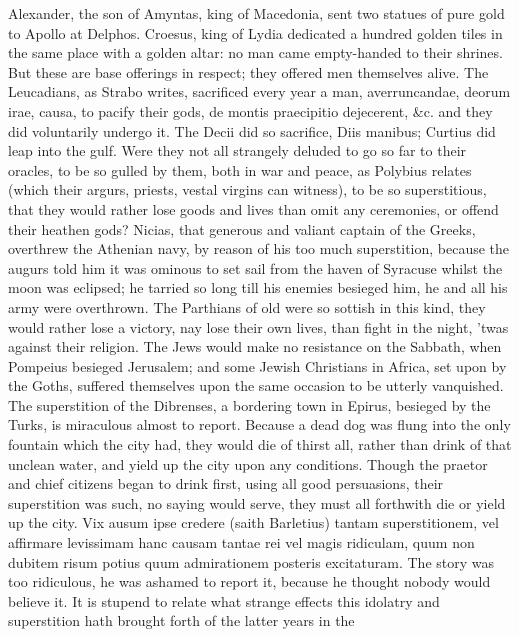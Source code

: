 {Alexander, the son of Amyntas, king of Macedonia, sent two
statues of pure gold to Apollo at Delphos. Croesus, king of Lydia
dedicated a hundred golden tiles in the same place with a golden altar:
no man came empty-handed to their shrines. But these are base offerings
in respect; they offered men themselves alive. The Leucadians, as
Strabo writes, sacrificed every year a man, averruncandae, deorum irae,
causa, to pacify their gods, de montis praecipitio dejecerent, \&c. and
they did voluntarily undergo it. The Decii did so sacrifice, Diis
manibus; Curtius did leap into the gulf. Were they not all strangely
deluded to go so far to their oracles, to be so gulled by them, both in
war and peace, as Polybius relates (which their argurs, priests, vestal
virgins can witness), to be so superstitious, that they would rather
lose goods and lives than omit any ceremonies, or offend their heathen
gods? Nicias, that generous and valiant captain of the Greeks,
overthrew the Athenian navy, by reason of his too much superstition,
 because the augurs told him it was ominous to set sail from the
haven of Syracuse whilst the moon was eclipsed; he tarried so long till
his enemies besieged him, he and all his army were overthrown. The
Parthians of old were so sottish in this kind, they would rather
lose a victory, nay lose their own lives, than fight in the night,
'twas against their religion. The Jews would make no resistance on the
Sabbath, when Pompeius besieged Jerusalem; and some Jewish Christians
in Africa, set upon by the Goths, suffered themselves upon the same
occasion to be utterly vanquished. The superstition of the Dibrenses, a
bordering town in Epirus, besieged by the Turks, is miraculous almost
to report. Because a dead dog was flung into the only fountain which
the city had, they would die of thirst all, rather than drink of that
unclean water, and yield up the city upon any conditions. Though
the praetor and chief citizens began to drink first, using all good
persuasions, their superstition was such, no saying would serve, they
must all forthwith die or yield up the city. Vix ausum ipse credere
(saith Barletius) tantam superstitionem, vel affirmare levissimam
hanc causam tantae rei vel magis ridiculam, quum non dubitem risum
potius quum admirationem posteris excitaturam. The story was too
ridiculous, he was ashamed to report it, because he thought nobody
would believe it. It is stupend to relate what strange effects this
idolatry and superstition hath brought forth of the latter years in the
}
